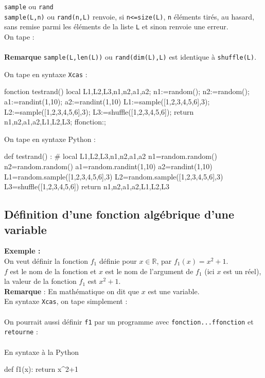 \documentclass[12pt,a4paper]{book}
\begin{document}
\begin{giacjshere}
{\tt sample} ou {\tt rand}\\
{\tt sample(L,n)} ou {\tt rand(n,L)} renvoie, si {\tt n<=size(L)}, {\tt n} 
\'el\'ements tir\'es, au hasard, sans remise parmi les \'el\'ements de la 
liste {\tt L} et sinon renvoie une erreur. \\
On tape :\\
\\
{\bf Remarque} {\tt sample(L,len(L))} ou {\tt rand(dim(L),L)} est identique 
\`a {\tt shuffle(L)}.

On tape  en syntaxe {\tt Xcas} :
\begin{giaconload}
fonction testrand()
  local L1,L2,L3,n1,n2,a1,a2;
  n1:=random();
  n2:=random();
  a1:=randint(1,10);
  a2:=randint(1,10)
  L1:=sample([1,2,3,4,5,6],3);
  L2:=sample([1,2,3,4,5,6],3);
  L3:=shuffle([1,2,3,4,5,6]);
  return n1,n2,a1,a2,L1,L2,L3;
ffonction:;
\end{giaconload}

On tape en syntaxe Python :
\begin{giaconload}
def testrand() :
    # local L1,L2,L3,n1,n2,a1,a2
    n1=random.random()
    n2=random.random()
    a1=random.randint(1,10)
    a2=randint(1,10)
    L1=random.sample([1,2,3,4,5,6],3)
    L2=random.sample([1,2,3,4,5,6],3)
    L3=shuffle([1,2,3,4,5,6])
    return n1,n2,a1,a2,L1,L2,L3 
\end{giaconload}


\subsection{D\'efinition d'une fonction alg\'ebrique d'une variable}
{\bf Exemple :}\\
On veut d\'efinir la fonction $f_1$ d\'efinie pour $x \in \mathbb{R}$, par 
$f_1(x)=x^2+1$.\\
 $f$ est le nom de la fonction et $x$ est le nom de l'argument de $f_1$ (ici $x$
 est un r\'eel), la valeur de la fonction  $f_1$ est $x^2+1$.\\
{\bf Remarque} : En math\'ematique on dit que $x$ est une variable.\\ 
 En syntaxe {\tt Xcas}, on tape simplement :\\
 \\
On pourrait aussi d\'efinir {\tt f1} par un programme
avec {\tt fonction...ffonction} et {\tt retourne} :\\
\\
En syntaxe \`a la Python\\
\begin{giacprog}
def f1(x):
    return x^2+1
\end{giacprog}


\end{giacjshere}
\end{document}
